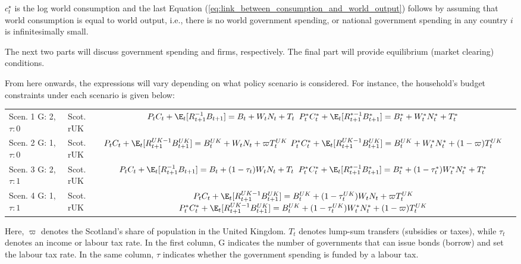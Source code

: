 $c_t^{\star}$ is the log world consumption and the last Equation (\ref{eq:link_between_consumption_and_world_output}) follows by assuming that world consumption is equal to world output, i.e., there is no world government spending, or national government spending in any country $i$ is infinitesimally small.

The next two parts will discuss government spending and firms, respectively. The final part will provide equilibrium (market clearing) conditions.

From here onwards, the expressions will vary depending on what policy scenario is considered. For instance, the household's budget constraints under each scenario is given below:
\begin{table}[H]
    \centering
    \renewcommand{\arraystretch}{2}
    \begin{tabular}{l|l|c}
    \makecell{Scen. 1 \\ G: 2, $\tau: 0$} & \makecell{Scot. \\ rUK } & 
        \makecell{
            $P_t C_t + \E_t [{R^{-1}_{t+1}}B_{t+1}] = B_t + W_t N_t + T_t$ \\
            $P^*_t C^*_t + \E_t [{R^{*-1}_{t+1}}B^*_{t+1}] = B^*_t + W^*_t N^*_t + T^*_t$
        }  \\ 
    \makecell{Scen. 2 \\ G: 1, $\tau: 0$} & \makecell{Scot. \\ rUK } & 
        \makecell{
            $P_t C_t + \E_t [{R^{UK-1}_{t+1}}B^{UK}_{t+1}] = B^{UK}_t + W_t N_t + \varpi T^{UK}_t$ \\
            $P^*_t C^*_t + \E_t [{R^{UK-1}_{t+1}}B^{UK}_{t+1}] = B^{UK}_t + W^*_t N^*_t + (1-\varpi)T^{UK}_t$
        }   \\ 
    \makecell{Scen. 3 \\ G: 2, $\tau: 1$} & \makecell{Scot. \\ rUK } & 
    \makecell{
        $P_t C_t + \E_t [{R^{-1}_{t+1}}B_{t+1}] = B_t + (1-\tau_t)W_t N_t + T_t$ \\
        $P^*_t C^*_t + \E_t [{R^{*-1}_{t+1}}B^*_{t+1}] = B^*_t + (1-\tau^*_t)W^*_t N^*_t + T^*_t$ 
    }  \\
    \makecell{Scen. 4 \\ G: 1, $\tau: 1$} & \makecell{Scot. \\ rUK } & 
    \makecell{
        $P_t C_t + \E_t [{R^{UK-1}_{t+1}}B^{UK}_{t+1}] = B^{UK}_t + (1-\tau^{UK}_t)W_t N_t + \varpi T^{UK}_t$ \\
        $P^*_t C^*_t + \E_t [{R^{UK-1}_{t+1}}B^{UK}_{t+1}] = B^{UK}_t + (1-\tau^{UK}_t)W^*_t N^*_t + (1-\varpi)T^{UK}_t$
    }  
    \end{tabular}
\end{table}
Here, $\varpi$ denotes the Scotland's share of population in the United Kingdom. $T_t$ denotes lump-sum transfers (subsidies or taxes), while $\tau_t$ denotes an income or labour tax rate. In the first column, G indicates the number of governments that can issue bonds (borrow) and set the labour tax rate. In the same column, $\tau$ indicates whether the government spending is funded by a labour tax.
